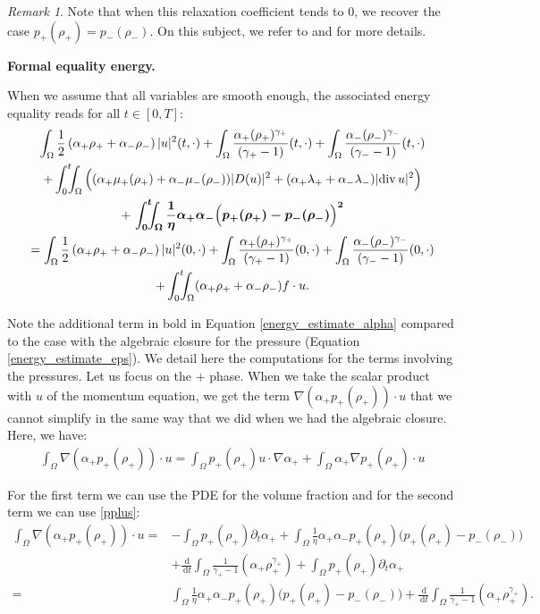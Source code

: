 \documentclass[11pt, twoside, a4paper]{article}
\theoremstyle{plain}
\theoremstyle{remark}
\newtheorem{remark}[theorem]{Remark}
\numberwithin{equation}{section}
\newcommand{\dd}{\,\mathrm{d}}
\renewcommand{\div}{\operatorname{div}}
\newcommand{\dt}{\partial_t}
\newcommand{\ap}{\alpha_+}
\newcommand{\am}{\alpha_-}
\newcommand{\rp}{\rho_+}
\newcommand{\rmi}{\rho_-}
\newcommand{\gp}{\gamma_{+}}
\begin{document}
\begin{remark}
    Note that when this relaxation coefficient tends to 0, we recover the case $p_+(\rp) = p_-(\rmi)$. On this subject, we refer to \cite{burtea2023pressure} and \cite{burtea2026relaxation} for more details.
\end{remark}

\noindent \textbf{Formal equality energy.}

When we assume that all variables are smooth enough, the associated energy equality reads for all $t \in[0, T]$:
\begin{multline}\label{energy_estimate_alpha}
        \int_{\Omega} \frac{1}{2}\left(\alpha_+ \rho_{+}+\alpha_-\rho_-\right)|u|^2(t,\cdot) +\int_{\Omega} \frac{\alpha_{+} (\rho_{+})^{\gamma_{+}}}{(\gamma_{+}-1)}(t,\cdot) +\int_{\Omega} \frac{\alpha_-(\rho_{-})^{\gamma_{-}}}{(\gamma_--1)}(t,\cdot) \\
        + \int_0^t\!\!\! \int_\Omega \Big( (\ap \mu_+(\rp) + \am \mu_-(\rmi)) \lvert D(u) \rvert^2 + (\ap \lambda_+ + \am \lambda_-) \lvert \div u \rvert^2 \Big) \\
        + \mbox{ \boldmath $\displaystyle \int_0^t\!\!\! \int_{\Omega} \frac{1}{\eta} \ap \am \Big(p_+(\rp)-p_-(\rmi)\Big)^2 $}\\
        = \int_{\Omega} \frac{1}{2}\left(\alpha_{+} \rho_{+}+\alpha_-\rho_-\right)|u|^2(0,\cdot) +\int_{\Omega} \frac{\alpha_{+} (\rho_{+})^{\gamma_{+}}}{(\gamma_{+}-1)}(0,\cdot) +\int_{\Omega} \frac{\alpha_-(\rho_-)^{\gamma_-}}{(\gamma_{-}-1)}(0,\cdot)\\
        +\int_0^t\!\!\! \int_\Omega (\ap \rp + \am \rmi) f \cdot u.
\end{multline}


Note the additional term in bold in Equation \eqref{energy_estimate_alpha} compared to the case with the algebraic closure for the pressure (Equation \eqref{energy_estimate_eps}). We detail here the computations for the terms involving the pressures. Let us focus on the $+$ phase. When we take the scalar product with $u$ of the momentum equation, we get the term $\nabla (\ap p_+(\rp)) \cdot u$ that we cannot simplify in the same way that we did when we had the algebraic closure. Here, we have:
\begin{align*}
    \int_\Omega \nabla (\ap p_+(\rp)) \cdot u = \int_\Omega p_+(\rp) u \cdot \nabla \ap + \int_\Omega \ap \nabla p_+(\rp) \cdot u
\end{align*}

For the first term we can use the PDE for the volume fraction and for the second term we can use \eqref{pplus}:
\begin{align*}
    \int_\Omega \nabla (\ap p_+(\rp)) \cdot u =& - \int_\Omega p_+(\rp) \dt \ap + \int_\Omega \frac{1}{\eta} \ap \am p_+(\rp) \Big(p_+(\rp)-p_-(\rmi)\Big)\\
    &+ \frac{\dd}{\dd t} \int_\Omega \frac{1}{\gp-1} (\ap \rp^{\gp}) + \int_\Omega p_+(\rp) \dt \ap\\
    =& \int_\Omega \frac{1}{\eta} \ap \am p_+(\rp) \Big(p_+(\rp)-p_-(\rmi)\Big)+ \frac{\dd}{\dd t} \int_\Omega \frac{1}{\gp-1} (\ap \rp^{\gp}).\\
\end{align*}
\end{document}
